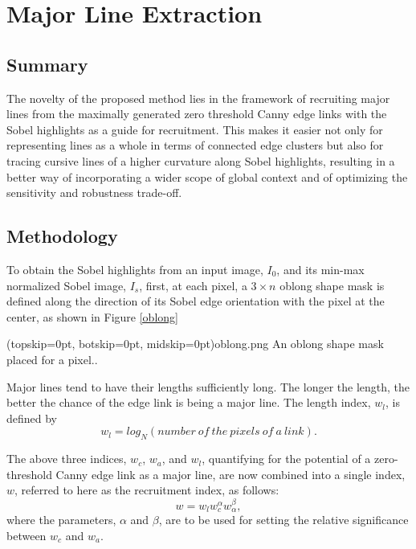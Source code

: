 \documentclass{ieeeaccess}
\begin{document}
\section{Major Line Extraction}
\label{sec:introduction}
\subsection{Summary}
The novelty of the proposed method\cite{7031358} lies in the framework
of recruiting major lines from the maximally generated zero
threshold Canny edge links with the Sobel highlights as a guide
for recruitment. This makes it easier not only for representing
lines as a whole in terms of connected edge clusters but also
for tracing cursive lines of a higher curvature along Sobel highlights, resulting in a better way of incorporating a wider scope of
global context and of optimizing the sensitivity and robustness
trade-off.

\subsection{Methodology}
To obtain the Sobel highlights from
an input image, $I_0$, and its min-max normalized Sobel image, $I_s$,
first, at each pixel, a $3\times n$ oblong shape mask is defined along the
direction of its Sobel edge orientation with the pixel at the center,
as shown in Figure \ref{oblong}

\Figure[t!](topskip=0pt, botskip=0pt, midskip=0pt){oblong.png}
{An oblong shape mask placed for a pixel.\label{oblong}}.

Major lines tend
to have their lengths sufficiently long. The longer the length,
the better the chance of the edge link is being a major line. The
length index, $w_l$, is defined by
\begin{equation}
w_l=log_N(number\ of\ the\ pixels\ of\ a\ link).
\end{equation}

The above three indices, $w_c$, $w_a$, and $w_l$, quantifying for the
potential of a zero-threshold Canny edge link as a major line,
are now combined into a single index, $w$, referred to here as the
recruitment index, as follows:
\begin{equation}
w=w_{l}w_{c}^{\alpha}w_{\alpha}^{\beta},
\end{equation}
where the parameters, $\alpha$ and $\beta$, are to be used for setting the
relative significance between $w_c$ and $w_a$.
\end{document}
